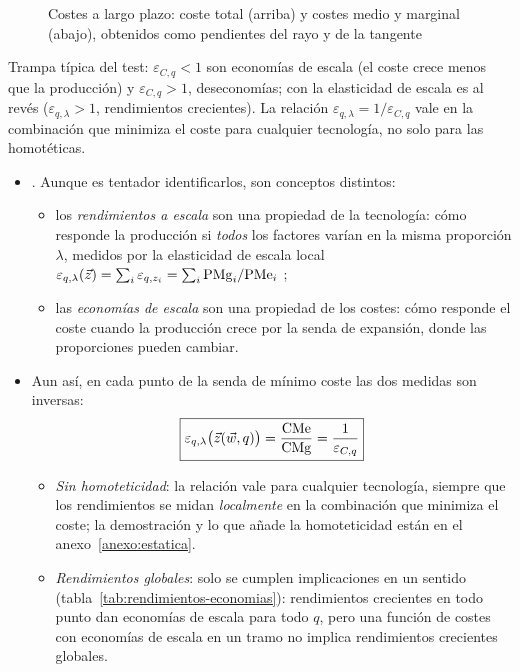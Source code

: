 \documentclass[11pt]{article}
\begin{document}
\begin{figure}[H]
\centering
\caption{Costes a largo plazo: coste total (arriba) y costes medio y marginal (abajo), obtenidos como pendientes del rayo y de la tangente}\label{fig:costes-largo}
\end{figure}

\begin{notaopositor}
Trampa típica del test: $\varepsilon_{C,q}<1$ son economías de escala (el coste crece menos que la producción) y $\varepsilon_{C,q}>1$, deseconomías; con la elasticidad de escala es al revés ($\varepsilon_{q,\lambda}>1$, rendimientos crecientes). La relación $\varepsilon_{q,\lambda}=1/\varepsilon_{C,q}$ vale en la combinación que minimiza el coste para cualquier tecnología, no solo para las homotéticas.
\end{notaopositor}

\begin{itemize}
\item {}. Aunque es tentador identificarlos, son conceptos distintos:
  \begin{itemize}
  \item los \emph{rendimientos a escala} son una propiedad de la tecnología: cómo responde la producción si \emph{todos} los factores varían en la misma proporción $\lambda$, medidos por la elasticidad de escala local $\varepsilon_{q,\lambda}(\vec{z})=\sum_i\varepsilon_{q,z_i}=\sum_i\mathrm{PMg}_i/\mathrm{PMe}_i$ ;
  \item las \emph{economías de escala} son una propiedad de los costes: cómo responde el coste cuando la producción crece por la senda de expansión, donde las proporciones pueden cambiar.
  \end{itemize}
\item Aun así, en cada punto de la senda de mínimo coste las dos medidas son inversas\nocite{Hanoch1975Elasticity}:
  \begin{equation}
  \boxed{\varepsilon_{q,\lambda}\big(\vec{z}(\vec{w},q)\big)=\frac{\mathrm{CMe}}{\mathrm{CMg}}=\frac{1}{\varepsilon_{C,q}}} \label{eq:escala-coste}
  \end{equation}
  \begin{itemize}
  \item \emph{Sin homoteticidad}: la relación vale para cualquier tecnología, siempre que los rendimientos se midan \emph{localmente} en la combinación que minimiza el coste; la demostración y lo que añade la homoteticidad están en el anexo~\ref{anexo:estatica}.
  \item \emph{Rendimientos globales}: solo se cumplen implicaciones en un sentido (tabla~\ref{tab:rendimientos-economias}): rendimientos crecientes en todo punto dan economías de escala para todo $q$, pero una función de costes con economías de escala en un tramo no implica rendimientos crecientes globales.
  \end{itemize}
\end{itemize}
\end{document}
